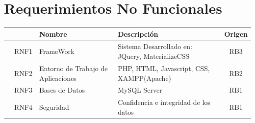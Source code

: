 \documentclass[11pt, fleqn]{article}                             %
\begin{document}
\section{Requerimientos No Funcionales}
    \begin{tabular}{r ||c |m{8em} | m{18em} |c }
       &   & Nombre & Descripción & Origen \\ [0.5ex] 
       \hline\hline
        & RNF1 & FrameWork &
        Sistema Desarrollado en: JQuery, MaterializeCSS
        & RB3\\

        & RNF2 & Entorno de Trabajo de Aplicaciones &
        PHP, HTML, Javascript, CSS, XAMPP(Apache)  
        & RB2\\

        & RNF3 & Bases de Datos & MySQL Server
        & RB1\\

        & RNF4 & Seguridad & Confidencia e integridad de los datos
        & RB1\\
    \end{tabular}


\clearpage
    



\clearpage

    
\end{document}
